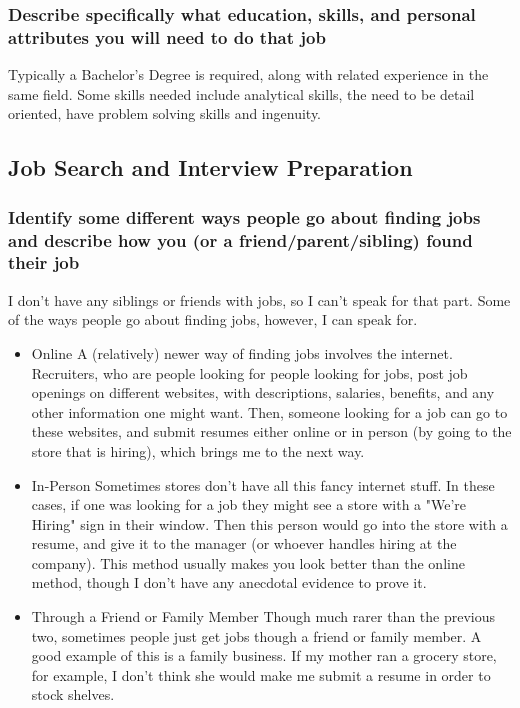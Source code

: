 \documentclass[11pt]{article}
\begin{document}
\subsubsection*{Describe specifically what education, skills, and personal attributes you will need to do that job}
\label{sec:org1c17328}
Typically a Bachelor's Degree is required, along with related experience in the same field. Some skills needed include analytical skills, the need to be detail oriented, have problem solving skills and ingenuity. 
\subsection*{Job Search and Interview Preparation}
\label{sec:org6b36eaf}
\subsubsection*{Identify some different ways people go about finding jobs and describe how you (or a friend/parent/sibling) found their job}
\label{sec:org4da5733}
I don't have any siblings or friends with jobs, so I can't speak for that part. Some of the ways people go about finding jobs, however, I can speak for.
\begin{itemize}
\item Online
\label{sec:orged8be26}
A (relatively) newer way of finding jobs involves the internet. Recruiters, who are people looking for people looking for jobs, post job openings on different websites, with descriptions, salaries, benefits, and any other information one might want. Then, someone looking for a job can go to these websites, and submit resumes either online or in person (by going to the store that is hiring), which brings me to the next way.
\item In-Person
\label{sec:org3edc9f3}
Sometimes stores don't have all this fancy internet stuff. In these cases, if one was looking for a job they might see a store with a "We're Hiring" sign in their window. Then this person would go into the store with a resume, and give it to the manager (or whoever handles hiring at the company). This method usually makes you look better than the online method, though I don't have any anecdotal evidence to prove it. 
\item Through a Friend or Family Member
\label{sec:org4d3f801}
Though much rarer than the previous two, sometimes people just get jobs though a friend or family member. A good example of this is a family business. If my mother ran a grocery store, for example, I don't think she would make me submit a resume in order to stock shelves.
\end{itemize}
\end{document}
